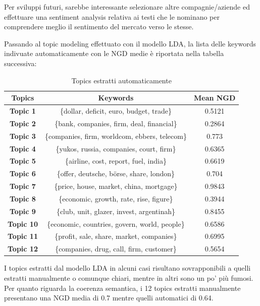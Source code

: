 \documentclass[]{article}
\begin{document}
Per sviluppi futuri, sarebbe interessante selezionare altre compagnie/aziende ed effettuare una sentiment analysis relativa ai testi che le nominano per comprendere meglio il sentimento del mercato verso le stesse.

Passando al topic modeling effettuato con il modello LDA, la lista delle keywords indivuate automaticamente con le NGD medie è riportata nella tabella successiva:

\begin{table}[H]
	\begin{center}
	\begin{tabular}{|c|c|c|}
		\hline 
		\textbf{Topics} & \textbf{Keywords} & \textbf{Mean NGD} \\ 
		\hline 
		\textbf{Topic 1} & \{dollar, deficit, euro, budget, trade\} & 0.5121 \\ 
		\hline 
		\textbf{Topic 2} & \{bank, companies, firm, deal, financial\} & 0.2864 \\ 
		\hline 
		\textbf{Topic 3} & \{companies, firm, worldcom, ebbers, telecom\} & 0.773 \\ 
		\hline 
		\textbf{Topic 4} & \{yukos, russia, companies, court, firm\} & 0.6365 \\ 
		\hline 
		\textbf{Topic 5} & \{airline, cost, report, fuel, india\} & 0.6619 \\ 
		\hline 
		\textbf{Topic 6} & \{offer, deutsche, börse, share, london\} & 0.704 \\ 
		\hline 
		\textbf{Topic 7} & \{price, house, market, china, mortgage\} & 0.9843 \\ 
		\hline 
		\textbf{Topic 8} & \{economic, growth, rate, rise, figure\} & 0.3944 \\ 
		\hline 
		\textbf{Topic 9} & \{club, unit, glazer, invest, argentinah\} & 0.8455 \\ 
		\hline 
		\textbf{Topic 10} & \{economic, countries, govern, world, people\} & 0.6586 \\ 
		\hline 
		\textbf{Topic 11} & \{profit, sale, share, market, companies\}  & 0.6995 \\ 
		\hline 
	    \textbf{Topic 12} & \{companies, drug, call, firm, customer\} & 0.5654 \\ 
		\hline 
	\end{tabular} 	
	\caption{Topics estratti automaticamente}
	\end{center}
\end{table}
I topics estratti dal modello LDA in alcuni casi risultano sovrapponibili a quelli estratti manualmente o comunque chiari, mentre in altri sono un po' più fumosi. Per quanto riguarda la coerenza semantica, i 12 topics estratti manualmente presentano una NGD media di 0.7 mentre quelli automatici di 0.64. 
\end{document}
